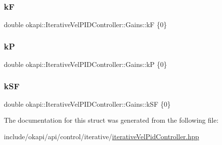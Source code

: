 \subsubsection{\texorpdfstring{kF}{kF}}
{\footnotesize\ttfamily double okapi\+::\+Iterative\+Vel\+P\+I\+D\+Controller\+::\+Gains\+::kF \{0\}}

\mbox{\label{structokapi_1_1IterativeVelPIDController_1_1Gains_a2c9a15d8ae4cd165fda3a1464debffcf}} 
\subsubsection{\texorpdfstring{kP}{kP}}
{\footnotesize\ttfamily double okapi\+::\+Iterative\+Vel\+P\+I\+D\+Controller\+::\+Gains\+::kP \{0\}}

\mbox{\label{structokapi_1_1IterativeVelPIDController_1_1Gains_af53bcd56585d99282ce99531b92ddf41}} 
\subsubsection{\texorpdfstring{kSF}{kSF}}
{\footnotesize\ttfamily double okapi\+::\+Iterative\+Vel\+P\+I\+D\+Controller\+::\+Gains\+::k\+SF \{0\}}



The documentation for this struct was generated from the following file\+:\begin{DoxyCompactItemize}
\item 
include/okapi/api/control/iterative/\mbox{\hyperlink{iterativeVelPidController_8hpp}{iterative\+Vel\+Pid\+Controller.\+hpp}}\end{DoxyCompactItemize}

